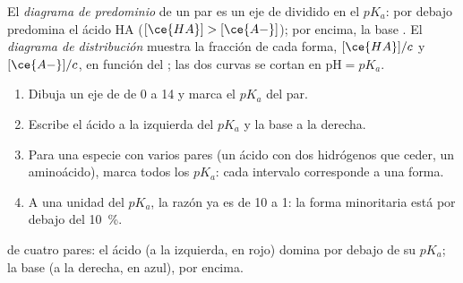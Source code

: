 \begin{definition}\label{def:g12:buffers-predominance:predominance}
El \emph{diagrama de predominio} de un par
es un eje de  dividido en el $pK_a$: por debajo predomina el ácido HA
($[\ce{HA}] > [\ce{A-}]$); por encima, la base . El \emph{diagrama
de distribución} muestra la fracción de
cada forma, $[\ce{HA}]/c$ y $[\ce{A-}]/c$, en función del ; las dos
curvas se cortan en $\mathrm{pH} = pK_a$.
\end{definition}

\begin{method}\label{met:g12:buffers-predominance:diagram}
\begin{enumerate}
  \item Dibuja un eje de  de 0 a 14 y marca el $pK_a$ del par.
  \item Escribe el ácido a la izquierda del $pK_a$ y la base a la derecha.
  \item Para una especie con varios pares (un ácido con dos hidrógenos que
        ceder, un aminoácido), marca todos los $pK_a$: cada intervalo
        corresponde a una forma.
  \item A una unidad del $pK_a$, la razón ya es de 10 a 1: la forma
        minoritaria está por debajo del \qty{10}{\percent}.
\end{enumerate}
\end{method}

\begin{omfigure}

{\small {} de cuatro pares: el ácido (a la
izquierda, en rojo) domina por debajo de su $pK_a$; la base (a la
derecha, en azul), por encima.}
\end{omfigure}

